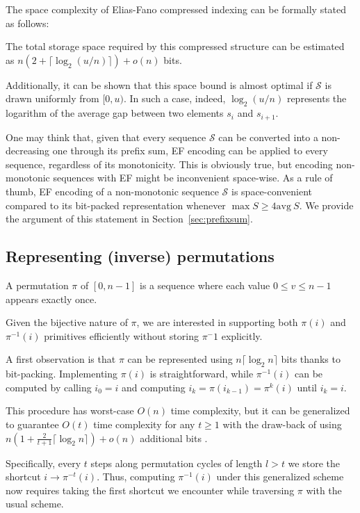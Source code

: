 The space complexity of Elias-Fano compressed indexing can be formally stated as follows:

\begin{theorem}\label{thm:ef_space}
The total storage space required by this compressed structure can be estimated as \( n (2 + \lceil \log_2(u/n) \rceil) + o(n)\) bits.     
\end{theorem}

Additionally, it can be shown that this space bound is almost optimal if $\mathcal S$ is drawn uniformly from $[0, u)$. In such a case, indeed, $\log_2 (u/n)$ represents the logarithm of the average gap between two elements $s_i$ and $s_{i + 1}$.

One may think that, given that every sequence $\mathcal S$ can be converted into a non-decreasing one through its prefix sum, EF encoding can be applied to every sequence, regardless of its monotonicity. This is obviously true, but encoding non-monotonic sequences with EF might be inconvenient space-wise. 
As a rule of thumb, EF encoding of a non-monotonic sequence $\mathcal S$ is space-convenient compared to its bit-packed representation whenever $\max S \ge 4 \mathrm{avg}\ S$. We provide the argument of this statement in Section~\ref{sec:prefixsum}.


\subsection{Representing (inverse) permutations}\label{sec:invperm}
A permutation $\pi$ of $[0, n - 1]$ is a sequence where each value $0 \le v \le n - 1$ appears exactly once. 

Given the bijective nature of $\pi$, we are interested in supporting both $\pi(i)$ and $\pi^{-1}(i)$ primitives efficiently without storing $\pi^-1$ explicitly.

A first observation is that $\pi$ can be represented using $n \lceil \log_2 n \rceil$ bits thanks to bit-packing. Implementing $\pi(i)$ is straightforward, while $\pi^{-1}(i)$ can be computed by calling $i_0 = i$ and computing $i_k = \pi(i_{k - 1}) = \pi^k(i)$ until $i_k = i$.

This procedure has worst-case $O(n)$ time complexity, but it can be generalized to guarantee $O(t)$ time complexity for any $t \ge 1$ with the draw-back of using $n ( 1 + \frac{2}{t + 1} \lceil \log_2 n \rceil) + o(n)$ additional bits \cite[Section~5.1]{CompactDS}.

Specifically, every $t$ steps along permutation cycles of length $l > t$ we store the shortcut $i \to \pi^{-t}(i)$. Thus, computing \(\pi^{-1}(i)\) under this generalized scheme now requires taking the first shortcut we encounter while traversing $\pi$ with the usual scheme.

